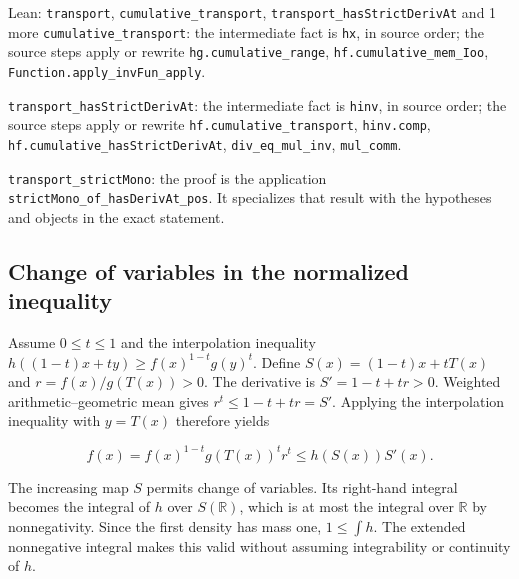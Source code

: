 \documentclass[11pt,a4paper]{report}
\begin{document}
\begin{leanbox}{Lean: \texttt{transport}, \texttt{cumulative\_\allowbreak{}transport}, \texttt{transport\_\allowbreak{}hasStrictDerivAt} and 1 more}
\texttt{cumulative\_\allowbreak{}transport}: the intermediate fact is \texttt{hx}, in source order; the source steps apply or rewrite \texttt{hg.\allowbreak{}cumulative\_\allowbreak{}range}, \texttt{hf.\allowbreak{}cumulative\_\allowbreak{}mem\_\allowbreak{}Ioo}, \texttt{Function.\allowbreak{}apply\_\allowbreak{}inv\allowbreak{}Fun\_\allowbreak{}apply}.



\texttt{transport\_\allowbreak{}has\allowbreak{}Strict\allowbreak{}Deriv\allowbreak{}At}: the intermediate fact is \texttt{hinv}, in source order; the source steps apply or rewrite \texttt{hf.\allowbreak{}cumulative\_\allowbreak{}transport}, \texttt{hinv.\allowbreak{}comp}, \texttt{hf.\allowbreak{}cumulative\_\allowbreak{}has\allowbreak{}Strict\allowbreak{}Deriv\allowbreak{}At}, \texttt{div\_\allowbreak{}eq\_\allowbreak{}mul\_\allowbreak{}inv}, \texttt{mul\_\allowbreak{}comm}.



\texttt{transport\_\allowbreak{}strict\allowbreak{}Mono}: the proof is the application \texttt{strict\allowbreak{}Mono\_\allowbreak{}of\_\allowbreak{}has\allowbreak{}Deriv\allowbreak{}At\_\allowbreak{}pos}. It specializes that result with the hypotheses and objects in the exact statement.
\end{leanbox}
\subsection{\texorpdfstring{Change of variables in the normalized inequality}{Change of variables in the normalized inequality}}
\label{report-step-IPLA-PrekopaLeindler-lean-4}


Assume \(0\le t\le1\) and the interpolation inequality \(h((1-t)x+ty)\ge f(x)^{1-t}g(y)^t\). Define \(S(x)=(1-t)x+tT(x)\) and \(r=f(x)/g(T(x))>0\). The derivative is \(S'=1-t+tr>0\). Weighted arithmetic–geometric mean gives \(r^t\le1-t+tr=S'\). Applying the interpolation inequality with \(y=T(x)\) therefore yields

\[f(x)=f(x)^{1-t}g(T(x))^t r^t\le h(S(x))S'(x).\]

The increasing map \(S\) permits change of variables. Its right-hand integral becomes the integral of \(h\) over \(S(\mathbb R)\), which is at most the integral over \(\mathbb R\) by nonnegativity. Since the first density has mass one, \(1\le\int h\). The extended nonnegative integral makes this valid without assuming integrability or continuity of \(h\).
\end{document}
